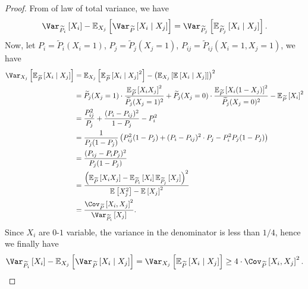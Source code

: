 \begin{proof}
	From of law of total variance, we have
	\[
		\Var_{\widetilde{P} _i}\left[X_i \right]  - \mathbb{E}_{X_j}\left[\Var_{\widetilde{P} }\left[X_i \mid X_j \right]  \right] = \Var_{\widetilde{P} _{j}}\left[\mathbb{E}_{\widetilde{P} _j}\left[X_i \mid X_j \right]  \right] .
	\]
	Now, let \(P_i = \widetilde{P} _i(X_i = 1)\), \(P_j= \widetilde{P} _j(X_j = 1)\), \(P_{ij}= \widetilde{P} _{ij}(X_i=1, X_j=1) \), we have
	\[
		\begin{split}
			\Var_{X_j}\left[\mathbb{E}_{\widetilde{P} }\left[X_i \mid X_j \right] \right]
			 & = \mathbb{E}_{X_j}\left[\mathbb{E}_{\widetilde{P} }\left[X_i \mid X_j \right] ^{2} \right] - \left( \mathbb{E}_{X_j}\left[ \mathbb{E}_{}\left[X_i\mid X_j \right] \right]  \right)^{2}                                                                                                                         \\
			 & =\widetilde{P} _j(X_j = 1)\cdot \frac{\mathbb{E}_{\widetilde{P} }\left[X_i X_j \right]^{2}}{\widetilde{P} _j(X_j = 1)^{2}} + \widetilde{P} _j(X_j = 0)\cdot \frac{\mathbb{E}_{\widetilde{P} }\left[X_i (1-X_j) \right]^{2}}{\widetilde{P} _j(X_j = 0)^{2}} - \mathbb{E}_{\widetilde{P} }\left[ X_i\right] ^{2} \\
			 & =\frac{P_{ij} ^{2} }{P_j} + \frac{(P_i - P_{ij} )^{2} }{1-P_j}- P_i ^{2}                                                                                                                                                                                                                                       \\
			 & =\frac{1}{P_j(1-P_j)} \left( P_{ij}^{2} (1-P_j) + (P_i - P_{ij} )^{2} \cdot P_j - P_i ^{2} P_j(1-P_j)  \right)                                                                                                                                                                                                 \\
			 & = \frac{(P_{ij} - P_i P_j)^{2} }{P_j(1-P_j)}                                                                                                                                                                                                                                                                   \\
			 & = \frac{\left( \mathbb{E}_{\widetilde{P} }\left[ X_i X_j\right] - \mathbb{E}_{\widetilde{P} _i}\left[ X_i\right] \mathbb{E}_{\widetilde{P} _j}\left[X_j \right] \right) ^{2} }{\mathbb{E}_{}\left[X_j^2 \right] - \mathbb{E}_{}\left[X_j \right] ^{2} }                                                        \\
			 & = \frac{\Cov_{\widetilde{P} }\left[X_i, X_j \right]^{2}  }{\Var_{\widetilde{P} _i}\left[X_j \right] }.
		\end{split}
	\]
	Since \(X_i\) are \(0\)-\(1\) variable, the variance in the denominator is less than \(1 / 4\), hence we finally have
	\[
		\Var_{\widetilde{P} _i}\left[X_i \right]  - \mathbb{E}_{X_j}\left[\Var_{\widetilde{P} }\left[X_i \mid X_j \right]  \right] = \Var_{X_j}\left[ \mathbb{E}_{\widetilde{P} }\left[X_i \mid X_j \right] \right] \geq 4\cdot \Cov_{\widetilde{P} }\left[X_i, X_j \right]^{2} .
	\]
\end{proof}

